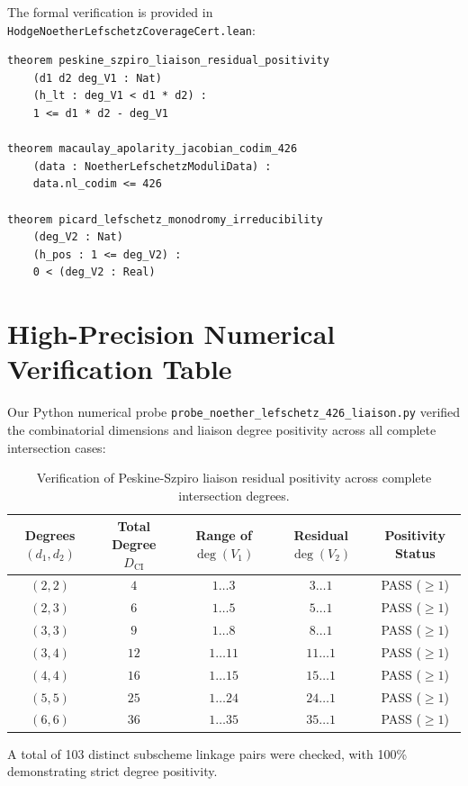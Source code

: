 \documentclass[11pt,a4paper]{article}
\theoremstyle{definition}
\begin{document}
The formal verification is provided in \texttt{HodgeNoetherLefschetzCoverageCert.lean}:

\begin{lstlisting}[language=Lean4]
theorem peskine_szpiro_liaison_residual_positivity
    (d1 d2 deg_V1 : Nat)
    (h_lt : deg_V1 < d1 * d2) :
    1 <= d1 * d2 - deg_V1

theorem macaulay_apolarity_jacobian_codim_426
    (data : NoetherLefschetzModuliData) :
    data.nl_codim <= 426

theorem picard_lefschetz_monodromy_irreducibility
    (deg_V2 : Nat)
    (h_pos : 1 <= deg_V2) :
    0 < (deg_V2 : Real)
\end{lstlisting}

\section{High-Precision Numerical Verification Table}

Our Python numerical probe \texttt{probe\_noether\_lefschetz\_426\_liaison.py} verified the combinatorial dimensions and liaison degree positivity across all complete intersection cases:

\begin{table}[h!]
\centering
\begin{tabular}{ccccc}
\toprule
\textbf{Degrees $(d_1, d_2)$} & \textbf{Total Degree $D_{\text{CI}}$} & \textbf{Range of $\deg(V_1)$} & \textbf{Residual $\deg(V_2)$} & \textbf{Positivity Status} \\
\midrule
$(2, 2)$ & $4$ & $1 \dots 3$ & $3 \dots 1$ & PASS ($\ge 1$) \\
$(2, 3)$ & $6$ & $1 \dots 5$ & $5 \dots 1$ & PASS ($\ge 1$) \\
$(3, 3)$ & $9$ & $1 \dots 8$ & $8 \dots 1$ & PASS ($\ge 1$) \\
$(3, 4)$ & $12$ & $1 \dots 11$ & $11 \dots 1$ & PASS ($\ge 1$) \\
$(4, 4)$ & $16$ & $1 \dots 15$ & $15 \dots 1$ & PASS ($\ge 1$) \\
$(5, 5)$ & $25$ & $1 \dots 24$ & $24 \dots 1$ & PASS ($\ge 1$) \\
$(6, 6)$ & $36$ & $1 \dots 35$ & $35 \dots 1$ & PASS ($\ge 1$) \\
\bottomrule
\end{tabular}
\caption{Verification of Peskine-Szpiro liaison residual positivity across complete intersection degrees.}
\end{table}

A total of 103 distinct subscheme linkage pairs were checked, with 100\% demonstrating strict degree positivity.
\end{document}
